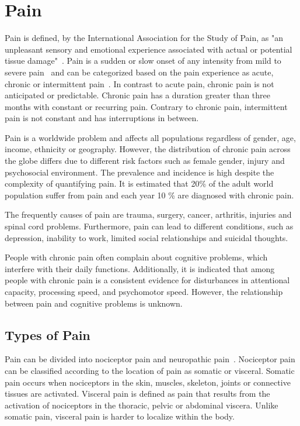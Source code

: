 \section{Pain} \label{sec:Pain}
Pain is defined, by the International Association for the Study of Pain, as "an unpleasant sensory and emotional experience associated with actual or potential tissue damage"~\cite{Kerstman2013}. 
Pain is a sudden or slow onset of any intensity from mild to severe pain~\cite{Mello2016} and can be categorized based on the pain experience as acute, chronic or intermittent pain~\cite{Goldberg2011}. In contrast to acute pain, chronic pain is not anticipated or predictable. Chronic pain has a duration greater than three months with constant or recurring pain. Contrary to chronic pain, intermittent pain is not constant and has interruptions in between. \cite{Mello2016}

Pain is a worldwide problem and affects all populations regardless of gender, age, income, ethnicity or geography. However, the distribution of chronic pain across the globe differs due to different risk factors such as female gender, injury and psychosocial environment. \cite{Macfarlanea2016}  The prevalence and incidence is high despite the complexity of quantifying pain. It is estimated that 20\% of the adult world population suffer from pain and each year 10 \% are diagnosed with chronic pain. \cite{Goldberg2011}

The frequently causes of pain are trauma, surgery, cancer, arthritis, injuries and spinal cord problems. Furthermore, pain can lead to different conditions, such as depression, inability to work, limited social relationships and suicidal thoughts.~\cite{Breivik2006, Goldberg2011}

People with chronic pain often complain about cognitive problems, which interfere with their daily functions. Additionally, it is indicated that among people with chronic pain is a consistent evidence for disturbances in attentional capacity, processing speed, and psychomotor speed. However, the relationship between pain and cognitive problems is unknown.~\cite{Geisser2018}

\subsection{Types of Pain}
Pain can be divided into nociceptor pain and neuropathic pain~\cite{Steeds2013}. Nociceptor pain can be classified according to the location of pain as somatic or visceral. Somatic pain occurs when nociceptors in the skin, muscles, skeleton, joints or connective tissues are activated. Visceral pain is defined as pain that results from the activation of nociceptors in the thoracic, pelvic or abdominal viscera. Unlike somatic pain, visceral pain is harder to localize within the body. \cite{Kerstman2013} 

